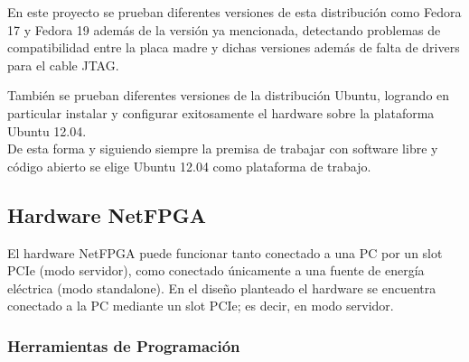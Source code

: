 En este proyecto se prueban diferentes versiones de esta distribución como Fedora 17 y Fedora 19 adem\'as de la versi\'on ya mencionada, detectando problemas de compatibilidad entre la placa madre y dichas versiones adem\'as de falta de drivers para el cable JTAG.


Tambi\'en se prueban diferentes versiones de la distribuci\'on Ubuntu, logrando en particular instalar y configurar exitosamente el hardware sobre la plataforma Ubuntu 12.04. \\

De esta forma y siguiendo siempre la premisa de trabajar con software libre y c\'odigo abierto se elige Ubuntu 12.04 como plataforma de trabajo.

\subsection{Hardware NetFPGA}

El hardware NetFPGA puede funcionar tanto conectado a una PC por un slot PCIe (modo servidor), como conectado \'unicamente a una fuente de energ\'ia el\'ectrica (modo standalone). En el dise\~no planteado el hardware se encuentra conectado a la PC mediante un slot PCIe; es decir, en modo servidor.


\subsubsection{Herramientas de Programaci\'on}

